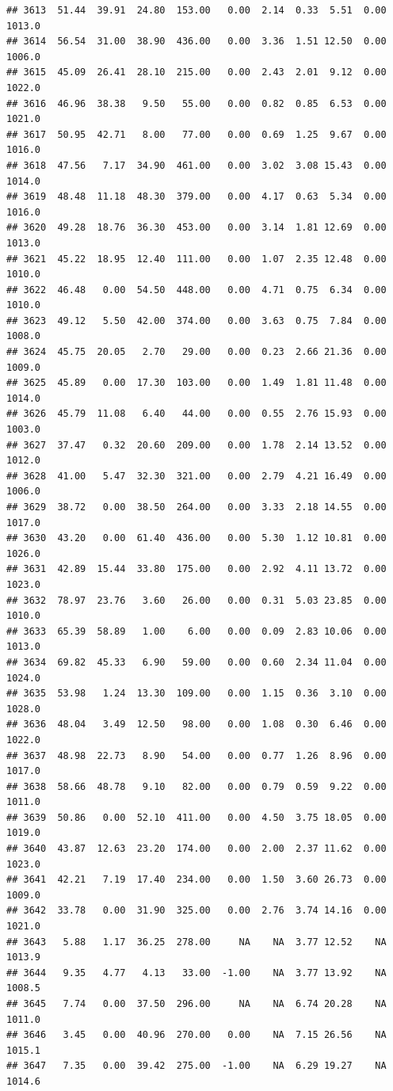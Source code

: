 \documentclass{article}\usepackage{graphicx, color}
\makeatletter
\newenvironment{kframe}{%
 \def\at@end@of@kframe{}%
 \ifinner\ifhmode%
  \def\at@end@of@kframe{\end{minipage}}%
  \begin{minipage}{\columnwidth}%
 \fi\fi%
 \def\FrameCommand##1{\hskip\@totalleftmargin \hskip-\fboxsep
 \colorbox{shadecolor}{##1}\hskip-\fboxsep
     \hskip-\linewidth \hskip-\@totalleftmargin \hskip\columnwidth}%
 \MakeFramed {\advance\hsize-\width
   \@totalleftmargin\z@ \linewidth\hsize
   \@setminipage}}%
 {\par\unskip\endMakeFramed%
 \at@end@of@kframe}
\newenvironment{knitrout}{}{} %
\makeatother
\begin{document}
\begin{knitrout}
\begin{kframe}
\begin{verbatim}
## 3613  51.44  39.91  24.80  153.00   0.00  2.14  0.33  5.51  0.00 1013.0
## 3614  56.54  31.00  38.90  436.00   0.00  3.36  1.51 12.50  0.00 1006.0
## 3615  45.09  26.41  28.10  215.00   0.00  2.43  2.01  9.12  0.00 1022.0
## 3616  46.96  38.38   9.50   55.00   0.00  0.82  0.85  6.53  0.00 1021.0
## 3617  50.95  42.71   8.00   77.00   0.00  0.69  1.25  9.67  0.00 1016.0
## 3618  47.56   7.17  34.90  461.00   0.00  3.02  3.08 15.43  0.00 1014.0
## 3619  48.48  11.18  48.30  379.00   0.00  4.17  0.63  5.34  0.00 1016.0
## 3620  49.28  18.76  36.30  453.00   0.00  3.14  1.81 12.69  0.00 1013.0
## 3621  45.22  18.95  12.40  111.00   0.00  1.07  2.35 12.48  0.00 1010.0
## 3622  46.48   0.00  54.50  448.00   0.00  4.71  0.75  6.34  0.00 1010.0
## 3623  49.12   5.50  42.00  374.00   0.00  3.63  0.75  7.84  0.00 1008.0
## 3624  45.75  20.05   2.70   29.00   0.00  0.23  2.66 21.36  0.00 1009.0
## 3625  45.89   0.00  17.30  103.00   0.00  1.49  1.81 11.48  0.00 1014.0
## 3626  45.79  11.08   6.40   44.00   0.00  0.55  2.76 15.93  0.00 1003.0
## 3627  37.47   0.32  20.60  209.00   0.00  1.78  2.14 13.52  0.00 1012.0
## 3628  41.00   5.47  32.30  321.00   0.00  2.79  4.21 16.49  0.00 1006.0
## 3629  38.72   0.00  38.50  264.00   0.00  3.33  2.18 14.55  0.00 1017.0
## 3630  43.20   0.00  61.40  436.00   0.00  5.30  1.12 10.81  0.00 1026.0
## 3631  42.89  15.44  33.80  175.00   0.00  2.92  4.11 13.72  0.00 1023.0
## 3632  78.97  23.76   3.60   26.00   0.00  0.31  5.03 23.85  0.00 1010.0
## 3633  65.39  58.89   1.00    6.00   0.00  0.09  2.83 10.06  0.00 1013.0
## 3634  69.82  45.33   6.90   59.00   0.00  0.60  2.34 11.04  0.00 1024.0
## 3635  53.98   1.24  13.30  109.00   0.00  1.15  0.36  3.10  0.00 1028.0
## 3636  48.04   3.49  12.50   98.00   0.00  1.08  0.30  6.46  0.00 1022.0
## 3637  48.98  22.73   8.90   54.00   0.00  0.77  1.26  8.96  0.00 1017.0
## 3638  58.66  48.78   9.10   82.00   0.00  0.79  0.59  9.22  0.00 1011.0
## 3639  50.86   0.00  52.10  411.00   0.00  4.50  3.75 18.05  0.00 1019.0
## 3640  43.87  12.63  23.20  174.00   0.00  2.00  2.37 11.62  0.00 1023.0
## 3641  42.21   7.19  17.40  234.00   0.00  1.50  3.60 26.73  0.00 1009.0
## 3642  33.78   0.00  31.90  325.00   0.00  2.76  3.74 14.16  0.00 1021.0
## 3643   5.88   1.17  36.25  278.00     NA    NA  3.77 12.52    NA 1013.9
## 3644   9.35   4.77   4.13   33.00  -1.00    NA  3.77 13.92    NA 1008.5
## 3645   7.74   0.00  37.50  296.00     NA    NA  6.74 20.28    NA 1011.0
## 3646   3.45   0.00  40.96  270.00   0.00    NA  7.15 26.56    NA 1015.1
## 3647   7.35   0.00  39.42  275.00  -1.00    NA  6.29 19.27    NA 1014.6

\end{verbatim}
\end{kframe}
\end{knitrout}
\end{document}
